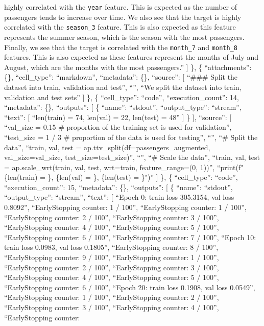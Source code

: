 \documentclass[
]{article}
\begin{document}
highly correlated with the \texttt{year} feature. This is expected as
the number of passengers tends to increase over time. We also see that
the target is highly correlated with the \texttt{season\_3} feature.
This is also expected as this feature represents the summer season,
which is the season with the most passengers. Finally, we see that the
target is correlated with the \texttt{month\_7} and \texttt{month\_8}
features. This is also expected as these features represent the months
of July and August, which are the months with the most passengers.\n''
{]} \}, \{ ``attachments'': \{\}, ``cell\_type'': ``markdown'',
``metadata'': \{\}, ``source'': {[} ``\#\#\# Split the dataset into
train, validation and test\n'', ``\n'', ``We split the dataset into
train, validation and test sets'' {]} \}, \{ ``cell\_type'': ``code'',
``execution\_count'': 14, ``metadata'': \{\}, ``outputs'': {[} \{
``name'': ``stdout'', ``output\_type'': ``stream'', ``text'': {[}
``len(train) = 74, len(val) = 22, len(test) = 48\n'' {]} \} {]},
``source'': {[} ``val\_size = 0.15 \# proportion of the training set is
used for validation\n'', ``test\_size = 1 / 3 \# proportion of the data
is used for testing\n'', ``\n'', ``\# Split the data\n'', ``train, val,
test = ap.ttv\_split(df=passengers\_augmented, val\_size=val\_size,
test\_size=test\_size)\n'', ``\n'', ``\# Scale the data\n'', ``train,
val, test = ap.scale\_wrt(train, val, test, wrt=train,
feature\_range=(0, 1))\n'', ``print(f"\{len(train) = \}, \{len(val) =
\}, \{len(test) = \}")\n'' {]} \}, \{ ``cell\_type'': ``code'',
``execution\_count'': 15, ``metadata'': \{\}, ``outputs'': {[} \{
``name'': ``stdout'', ``output\_type'': ``stream'', ``text'': {[}
``Epoch 0: train loss 305.3154, val loss 0.8092\n'', ``EarlyStopping
counter: 1 / 100\n'', ``EarlyStopping counter: 1 / 100\n'',
``EarlyStopping counter: 2 / 100\n'', ``EarlyStopping counter: 3 /
100\n'', ``EarlyStopping counter: 4 / 100\n'', ``EarlyStopping counter:
5 / 100\n'', ``EarlyStopping counter: 6 / 100\n'', ``EarlyStopping
counter: 7 / 100\n'', ``Epoch 10: train loss 0.0983, val loss
0.1805\n'', ``EarlyStopping counter: 8 / 100\n'', ``EarlyStopping
counter: 9 / 100\n'', ``EarlyStopping counter: 1 / 100\n'',
``EarlyStopping counter: 2 / 100\n'', ``EarlyStopping counter: 3 /
100\n'', ``EarlyStopping counter: 4 / 100\n'', ``EarlyStopping counter:
5 / 100\n'', ``EarlyStopping counter: 6 / 100\n'', ``Epoch 20: train
loss 0.1908, val loss 0.0549\n'', ``EarlyStopping counter: 1 / 100\n'',
``EarlyStopping counter: 2 / 100\n'', ``EarlyStopping counter: 3 /
100\n'', ``EarlyStopping counter: 4 / 100\n'', ``EarlyStopping counter:
\end{document}
